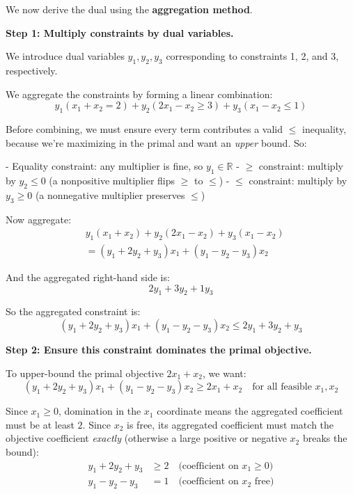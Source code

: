 We now derive the dual using the \textbf{aggregation method}.

\vspace{0.5em}
\textbf{Step 1: Multiply constraints by dual variables.}

We introduce dual variables \( y_1, y_2, y_3 \) corresponding to constraints 1, 2, and 3, respectively.

We aggregate the constraints by forming a linear combination:
\[
y_1(x_1 + x_2 = 2) + y_2(2x_1 - x_2 \geq 3) + y_3(x_1 - x_2 \leq 1)
\]

Before combining, we must ensure every term contributes a valid \( \leq \) inequality, because we're maximizing in the primal and want an \emph{upper} bound. So:

- Equality constraint: any multiplier is fine, so \( y_1 \in \mathbb{R} \)
- \( \geq \) constraint: multiply by \( y_2 \leq 0 \) (a nonpositive multiplier flips \( \geq \) to \( \leq \))
- \( \leq \) constraint: multiply by \( y_3 \geq 0 \) (a nonnegative multiplier preserves \( \leq \))

Now aggregate:
\[
\begin{aligned}
& y_1(x_1 + x_2) + y_2(2x_1 - x_2) + y_3(x_1 - x_2) \\
&= (y_1 + 2y_2 + y_3)x_1 + (y_1 - y_2 - y_3)x_2
\end{aligned}
\]

And the aggregated right-hand side is:
\[
2y_1 + 3y_2 + 1y_3
\]

So the aggregated constraint is:
\[
(y_1 + 2y_2 + y_3)x_1 + (y_1 - y_2 - y_3)x_2 \leq 2y_1 + 3y_2 + y_3
\]

\vspace{0.5em}
\textbf{Step 2: Ensure this constraint dominates the primal objective.}

To upper-bound the primal objective \( 2x_1 + x_2 \), we want:
\[
(y_1 + 2y_2 + y_3)x_1 + (y_1 - y_2 - y_3)x_2 \geq 2x_1 + x_2 \quad \text{for all feasible } x_1, x_2
\]

Since \( x_1 \geq 0 \), domination in the \( x_1 \) coordinate means the aggregated coefficient must be at least \( 2 \).  Since \( x_2 \) is free, its aggregated coefficient must match the objective coefficient \emph{exactly} (otherwise a large positive or negative \( x_2 \) breaks the bound):
\[
\begin{aligned}
y_1 + 2y_2 + y_3 &\geq 2 \quad \text{(coefficient on } x_1 \geq 0) \\
y_1 - y_2 - y_3 &= 1 \quad \text{(coefficient on } x_2 \text{ free})
\end{aligned}
\]

